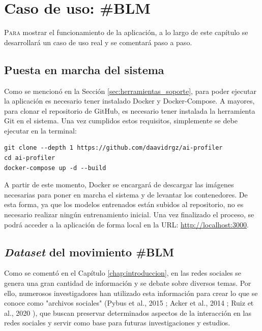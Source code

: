 \chapter{Caso de uso: \#BLM}
\label{chap:casouso}

\lettrine{P}{ara} mostrar el funcionamiento de la aplicación, a lo largo de este capítulo se desarrollará un caso de uso real y se comentará paso a paso.

\section{Puesta en marcha del sistema}
\label{sec:casouso_puesta_en_marcha}

Como se mencionó en la Sección \ref{sec:herramientas_soporte}, para poder ejecutar la aplicación es necesario tener
instalado Docker y Docker-Compose. A mayores, para clonar el repositorio de GitHub, es necesario tener instalada la
herramienta Git en el sistema. Una vez cumplidos estos requisitos, simplemente se debe ejecutar en la terminal:

\bigskip
\begin{Verbatim}
git clone --depth 1 https://github.com/daavidrgz/ai-profiler
cd ai-profiler
docker-compose up -d --build
\end{Verbatim}

\bigskip
A partir de este momento, Docker se encargará de descargar las imágenes necesarias para poner en marcha el sistema y de levantar los
contenedores. De esta forma, ya que los modelos entrenados están subidos al repositorio, no es necesario realizar
ningún entrenamiento inicial. Una vez finalizado el proceso, se podrá acceder a la aplicación de forma local en la URL: \url{http://localhost:3000}.

\section{\textit{Dataset} del movimiento \#BLM}
\label{sec:casouso_dataset}

Como se comentó en el Capítulo \ref{chap:introduccion}, en las redes sociales se genera una gran cantidad de información y se debate sobre
diversos temas. Por ello, numerosos investigadores han utilizado esta información para crear lo que se conoce como "archivos sociales"
(Pybus et al., 2015 \cite{pybus2015hacking}; Acker et al., 2014 \cite{acker2014death}; Ruiz et al., 2020 \cite{ruiz2020cuentalo}),
que buscan preservar determinados aspectos de la interacción en las redes sociales y servir como base para futuras investigaciones
y estudios.

